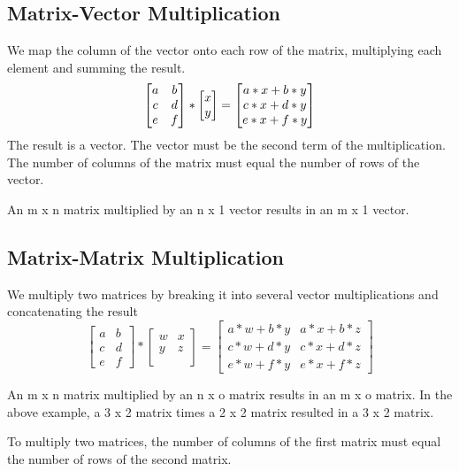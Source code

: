 \documentclass{article}
\begin{document}
\subsection{Matrix-Vector Multiplication}
We map the column of the vector onto each row of the matrix, multiplying each element and summing the result.
$$\begin{bmatrix}  a & b \\   c & d \\   e & f \end{bmatrix} *\begin{bmatrix}  x \\   y \newline  \end{bmatrix} =\begin{bmatrix}  a*x + b*y \\   c*x + d*y \\   e*x + f*y\end{bmatrix}$$
The result is a vector. The vector must be the second term of the multiplication. The number of columns of the matrix must equal the number of rows of the vector.

An m x n matrix multiplied by an n x 1 vector results in an m x 1 vector.
\subsection{Matrix-Matrix Multiplication}
We multiply two matrices by breaking it into several vector multiplications and concatenating the result
$$\begin{bmatrix}  a & b \\   c & d \\   e & f \end{bmatrix} *\begin{bmatrix}  w & x \\   y & z \\  \end{bmatrix} =\begin{bmatrix}  a*w + b*y & a*x + b*z \\   c*w + d*y & c*x + d*z \\   e*w + f*y & e*x + f*z\end{bmatrix}$$

An m x n matrix multiplied by an n x o matrix results in an m x o matrix. In the above example, a 3 x 2 matrix times a 2 x 2 matrix resulted in a 3 x 2 matrix.

To multiply two matrices, the number of columns of the first matrix must equal the number of rows of the second matrix.
\end{document}
